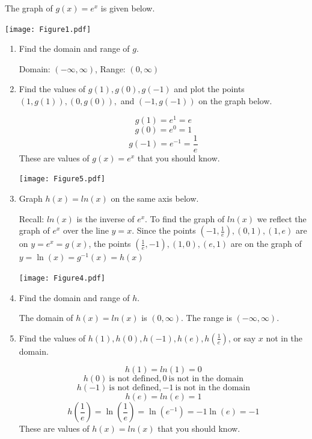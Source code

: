 \documentclass[nooutcomes]{ximera}
\begin{document}
\begin{problem}
The graph of $g(x)=e^x$ is given below.

	\begin{image}		
	\texttt{[image: Figure1.pdf]}
	\end{image}

\begin{enumerate}	
	\item  Find the domain and range of $g$.
		\begin{freeResponse}
		Domain: $(-\infty,\infty)$, Range: $(0,\infty)$
		\end{freeResponse}


	
	\item  Find the values of $g(1), g(0), g(-1)$ and plot the points $(1,g(1)), (0,g(0)),$ and $(-1,g(-1))$  on the graph below.
		\begin{freeResponse}
	
			$$g(1)=e^1=e$$
			$$ g(0)=e^0=1$$ 
			$$g(-1)=e^{-1}=\frac{1}{e}$$
			 These are values of $g(x)=e^x$ that you should know.

		\begin{image}		
		\texttt{[image: Figure5.pdf]}
		\end{image}


		\end{freeResponse}
	\item Graph $h(x)=ln(x)$ on the same axis below.
		\begin{freeResponse}
		Recall:  $ln(x)$ is the inverse of $e^x$.  To find the graph of $ln(x)$ we reflect the graph of $e^x$ over the line $y=x$.  Since the points $\left(-1,\frac{1}{e}\right),(0,1),(1,e)$ are on $y=e^x=g(x)$, the points $\left(\frac{1}{e}, -1\right),(1,0),(e,1)$ are on the graph of $y=\ln(x)=g^{-1}(x)=h(x)$ 

		\begin{image}		
		\texttt{[image: Figure4.pdf]}
		\end{image}
		\end{freeResponse}

	\item Find the domain and range of $h$.
		\begin{freeResponse}
		The domain of $h(x)=ln(x)$ is $(0,\infty)$.  The range is $(-\infty,\infty)$.
		\end{freeResponse}

	\item Find the values of $h(1), h(0), h(-1), h(e), h\left(\frac{1}{e}\right)$, or say $x$ not in the domain.
			\begin{freeResponse}
			 $$h(1)=ln(1)=0$$
			$$ h(0)\ \text{is not defined}, 0\ \text{is not in the domain}$$
			$$ h(-1)\ \text{is not defined}, -1\ \text{is not in the domain}$$
			$$h(e)=ln(e)=1$$
			$$h\left(\frac{1}{e}\right)=\ln\left(\frac{1}{e}\right)=\ln\left(e^{-1}\right)= -1\ln(e)=-1$$
			 These are values of $h(x)=ln(x)$ that you should know.
		\end{freeResponse}
	\end{enumerate}
	
 		
		
	
\end{problem}
\end{document}
